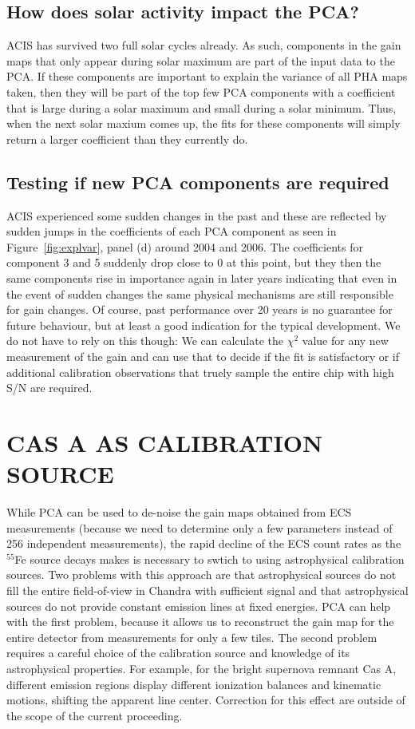\documentclass[]{spie}  %
\begin{document}
\subsection{How does solar activity impact the PCA?}
ACIS has survived two full solar cycles already. As such, components in the gain maps that only appear during solar maximum are part of the input data to the PCA. If these components are important to explain the variance of all PHA maps taken, then they will be part of the top few PCA components with a coefficient that is large during a solar maximum and small during a solar minimum. Thus, when the next solar maxium comes up, the fits for these components will simply return a larger coefficient than they currently do.

\subsection{Testing if new PCA components are required}
ACIS experienced some sudden changes in the past and these are reflected by sudden jumps in the coefficients of each PCA component as seen in Figure~\ref{fig:explvar}, panel (d) around 2004 and 2006. The coefficients for component 3 and 5 suddenly drop close to 0 at this point, but they then the same components rise in importance again in later years indicating that even in the event of sudden changes the same physical mechanisms are still responsible for gain changes. Of course, past performance over 20 years is no guarantee for future behaviour, but at least a good indication for the typical development. We do not have to rely on this though: We can calculate the $\chi^2$ value for any new measurement of the gain and can use that to decide if the fit is satisfactory or if additional calibration observations that truely sample the entire chip with high S/N are required.

\section{CAS A AS CALIBRATION SOURCE}
While PCA can be used to de-noise the gain maps obtained from ECS measurements (because we need to determine only a few parameters instead of 256 independent measurements), the rapid decline of the ECS count rates as the $^{55}$Fe source decays makes is necessary to swtich to using astrophysical calibration sources. Two problems with this approach are that astrophysical sources do not fill the entire field-of-view in Chandra with sufficient signal and that astrophysical sources do not provide constant emission lines at fixed energies. PCA can help with the first problem, because it allows us to reconstruct the gain map for the entire detector from measurements for only a few tiles. The second problem requires a careful choice of the calibration source and knowledge of its astrophysical properties. For example, for the bright supernova remnant Cas A, different emission regions display different ionization balances and kinematic motions, shifting the apparent line center\cite{2010ApJ...725.2038D,2012ApJ...746..130H}. Correction for this effect are outside of the scope of the current proceeding.
\end{document}
